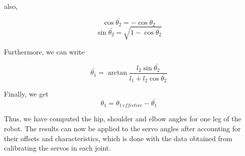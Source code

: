also,

\[\cos{\bar{\theta_2}} = -\cos{\theta_2}\]
\[\sin{\bar{\theta_2}} = \sqrt{1 - \cos{\bar{\theta_2}}}\]

Furthermore, we can write

\[\bar{\theta_1} = \arctan{\frac{l_2 \sin{\bar{\theta_2}}}{l_1 + l_2 \cos{\bar{\theta_2}}}}\]

Finally, we get
\[\theta_1 = \theta_{1 \ effective} - \bar{\theta_1}\]

Thus, we have computed the hip, shoulder and elbow angles for one leg of the robot. The results can now be applied to the servo angles after accounting for their offsets and characteristics, which is done with the data obtained from calibrating the servos in each joint.

